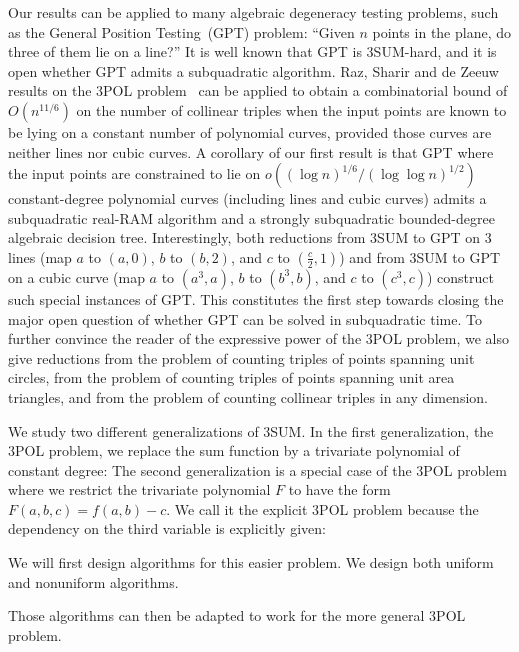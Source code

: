 Our results can be applied to many algebraic degeneracy testing problems, such
as the General Position Testing~(GPT) problem: ``Given $n$ points in the plane, do
three of them lie on a line?'' It is well known that GPT is 3SUM-hard,
and it is open whether GPT admits a subquadratic algorithm. Raz, Sharir
and de Zeeuw results on the 3POL problem~\cite{RSZ15} can be applied to obtain
a combinatorial bound of $O(n^{11/6})$ on the
number of collinear triples when the input points are known to be lying on
a constant number of polynomial curves, provided those curves are neither
lines nor cubic curves. A corollary of our first result is that
GPT where the input points are constrained to lie on
$o({(\log n)}^{1/6}/{(\log \log n)}^{1/2})$
constant-degree polynomial curves (including lines and cubic curves)
admits a subquadratic real-RAM algorithm and
a strongly subquadratic bounded-degree algebraic decision tree.
Interestingly, both reductions from 3SUM to GPT on 3 lines (map $a$ to $(a,0)$,
$b$ to $(b,2)$, and $c$ to $(\frac c2, 1)$) and from 3SUM to GPT on a
cubic curve (map $a$ to $(a^3,a)$, $b$ to $(b^3,b)$, and $c$ to $(c^3,c)$)
construct such special instances of GPT\@.
This constitutes the first step towards closing the major open question of
whether GPT can be solved in subquadratic time.
%
To further convince the reader of the expressive power of the 3POL problem,
we also give reductions from the problem of counting triples of points spanning
unit circles, from the problem of counting triples of points spanning unit area
triangles, and from the problem of counting collinear triples in any dimension.

We study two different generalizations of 3SUM\@. In the first generalization,
the 3POL problem, we replace the sum function by a trivariate
polynomial of constant degree:
\ProblemPOLImplicit*
The second generalization is a special case of the 3POL problem where we
restrict the trivariate polynomial $F$ to have the form $F(a,b,c) = f(a,b) -
c$. We call it the explicit 3POL problem because the dependency on the third
variable is explicitly given:

We will first design algorithms for this easier problem.
We design both uniform and nonuniform algorithms.




Those algorithms can then be adapted to work for the more general 3POL
problem.




